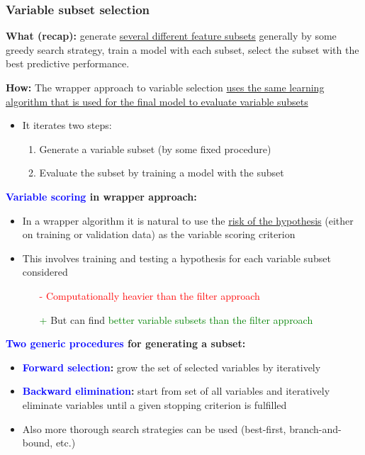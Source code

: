 \documentclass[12pt, a4paper]{article}
\makeatletter
\newcommand\subsubsubsection{\@startsection{paragraph}{4}{\z@}{-2.5ex\@plus -1ex \@minus -.25ex}{1.25ex \@plus .25ex}{\normalfont\normalsize\bfseries}}
\makeatother
\begin{document}
\subsubsection{Variable subset selection}\label{variable-subset-selection}

\textbf{What (recap):} generate \uline{several different feature subsets} generally by some greedy search strategy, train a model with each subset, select the subset with the best predictive performance.

\subsubsubsection{Wrapper approach}\label{wrapper-approach}

\textbf{How:} The wrapper approach to variable selection \uline{uses the same learning algorithm that is used for the final model to evaluate variable subsets}
\begin{itemize}
  \item It iterates two steps:
  \begin{enumerate}
    \item Generate a variable subset (by some fixed procedure)
    \item Evaluate the subset by training a model with the subset
  \end{enumerate}
\end{itemize}

\textbf{\textcolor{blue}{Variable scoring} in wrapper approach:}
\begin{itemize}
  \item In a wrapper algorithm it is natural to use the \uline{risk of the hypothesis} (either on training or validation data) as the variable scoring criterion
  \item This involves training and testing a hypothesis for each variable subset considered
  \begin{itemize}
    \item[\textcolor{red}{-}] \textcolor{red}{Computationally heavier than the filter approach}
    \item[\textcolor{Green}{+}] But can find \textcolor{Green}{better variable subsets than the filter approach}
  \end{itemize}
\end{itemize}

\textbf{\textcolor{blue}{Two generic procedures} for generating a subset:}
\begin{itemize}
  \item \textbf{\textcolor{blue}{Forward selection}:} grow the set of selected variables by iteratively
  \item \textbf{\textcolor{blue}{Backward elimination}:} start from set of all variables and iteratively eliminate variables until a given stopping criterion is fulfilled
  \item Also more thorough search strategies can be used (best-first,
branch-and-bound, etc.)
\end{itemize}
\end{document}
